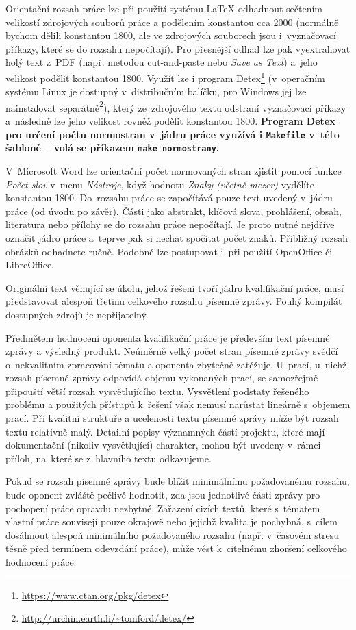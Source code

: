 Orientační rozsah práce lze při použití systému \LaTeX{} odhadnout sečtením velikostí zdrojových souborů práce a podělením konstantou cca 2000 (normálně bychom dělili konstantou 1800, ale ve zdrojových souborech jsou i~vyznačovací příkazy, které se do rozsahu nepočítají). Pro přesnější odhad lze pak vyextrahovat holý text z~PDF (např. metodou cut-and-paste nebo {\it Save as Text}) a~jeho velikost podělit konstantou 1800. Využít lze i program Detex\footnote{\url{https://www.ctan.org/pkg/detex}} (v~operačním systému Linux je dostupný v~distribučním balíčku, pro Windows jej lze nainstalovat separátně\footnote{\url{http://urchin.earth.li/~tomford/detex/}}), který ze~zdrojového textu odstraní vyznačovací příkazy a~následně lze jeho velikost rovněž podělit konstantou 1800. \bf Program Detex pro určení počtu normostran v~jádru práce využívá i \texttt{Makefile} v~této šabloně \rm -- volá se příkazem \verb|make normostrany|.

V~Microsoft Word lze orientační počet normovaných stran zjistit pomocí funkce {\it Počet slov} v~menu {\it Nástroje}, když hodnotu {\it Znaky (včetně mezer)} vydělíte konstantou 1800. Do~rozsahu práce se započítává pouze text uvedený v~jádru práce (od úvodu po závěr). Části jako abstrakt, klíčová slova, prohlášení, obsah, literatura nebo přílohy se do rozsahu práce nepočítají. Je proto nutné nejdříve označit jádro práce a~teprve pak si nechat spočítat počet znaků. Přibližný rozsah obrázků odhadnete ručně. Podobně lze postupovat i~při použití OpenOffice či LibreOffice.


Originální text věnující se úkolu, jehož řešení tvoří jádro kvalifikační práce, musí představovat alespoň třetinu celkového rozsahu písemné zprávy. Pouhý kompilát dostupných zdrojů je nepřijatelný.

Předmětem hodnocení oponenta kvalifikační práce je především text písemné zprávy a výsledný produkt. Neúměrně velký počet stran písemné zprávy svědčí o~nekvalitním zpracování tématu a oponenta zbytečně zatěžuje. U~prací, u~nichž rozsah písemné zprávy odpovídá objemu vykonaných prací, se samozřejmě připouští větší rozsah vysvětlujícího textu. Vysvětlení podstaty řešeného problému a použitých přístupů k~řešení však nemusí narůstat lineárně s~objemem prací. Při kvalitní struktuře a ucelenosti textu písemné zprávy může být rozsah textu relativně malý. Detailní popisy významných částí projektu, které mají dokumentační (nikoliv vysvětlující) charakter, mohou být uvedeny v~rámci příloh, na~které se z~hlavního textu odkazujeme.

Pokud se rozsah písemné zprávy bude blížit minimálnímu požadovanému rozsahu, bude oponent zvláště pečlivě hodnotit, zda jsou jednotlivé části zprávy pro pochopení práce opravdu nezbytné. Zařazení cizích textů, které s~tématem vlastní práce souvisejí pouze okrajově nebo jejichž kvalita je pochybná, s~cílem dosáhnout alespoň minimálního požadovaného rozsahu (např. v~časovém stresu těsně před termínem odevzdání práce), může vést k~citelnému zhoršení celkového hodnocení práce.

